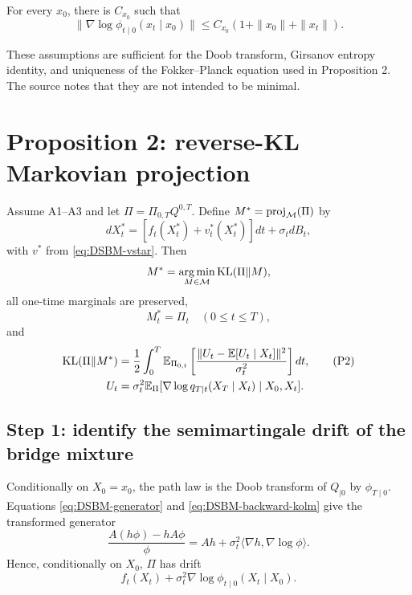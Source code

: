 \begin{assumption}
For every \(x_0\), there is \(C_{x_0}\) such that
\[
 \|\nabla\log\phi_{t\mid0}(x_t\mid x_0)\|
 \le C_{x_0}(1+\|x_0\|+\|x_t\|).
\]
\end{assumption}

These assumptions are sufficient for the Doob transform, Girsanov entropy identity, and uniqueness of the Fokker--Planck equation used in Proposition 2.  The source notes that they are not intended to be minimal.

\section{Proposition 2: reverse-KL Markovian projection}

\begin{proposition}[Proposition 2]
Assume A1--A3 and let \(\Pi=\Pi_{0,T}Q^{0,T}\).  Define \(M^*=\operatorname{proj}_{\mathcal{M}}(\Pi)\) by
\begin{equation}
 dX_t^*=[f_t(X_t^*)+v_t^*(X_t^*)]dt+\sigma_t dB_t,
 \tag{Definition 1}\label{eq:DSBM-Mstar}
\end{equation}
with \(v^*\) from \eqref{eq:DSBM-vstar}.  Then
\[
 M^*=\operatorname*{arg\,min}_{M\in\mathcal{M}}\mathrm{KL}(\Pi\|M),
\]
all one-time marginals are preserved,
\[
 M_t^*=\Pi_t\quad(0\le t\le T),
\]
and
\begin{align}
 \mathrm{KL}(\Pi\|M^*)
 &=\frac12\int_0^T\mathbb{E}_{\Pi_{0,t}}
 \left[
 \frac{\|U_t-\mathbb{E}[U_t\mid X_t]\|^2}{\sigma_t^2}
 \right]dt,
 \tag{P2}\label{eq:DSBM-P2-value}\\
 U_t
 &=\sigma_t^2\mathbb{E}_\Pi[\nabla\log q_{T\mid t}(X_T\mid X_t)\mid X_0,X_t].
\end{align}
\end{proposition}

\subsection{Step 1: identify the semimartingale drift of the bridge mixture}
Conditionally on \(X_0=x_0\), the path law is the Doob transform of \(Q_{\mid0}\) by \(\phi_{T\mid0}\).  Equations \eqref{eq:DSBM-generator} and \eqref{eq:DSBM-backward-kolm} give the transformed generator
\[
 \frac{A(h\phi)-hA\phi}{\phi}
 =Ah+\sigma_t^2\langle\nabla h,\nabla\log\phi\rangle.
\]
Hence, conditionally on \(X_0\), \(\Pi\) has drift
\begin{equation}
 f_t(X_t)+\sigma_t^2\nabla\log\phi_{t\mid0}(X_t\mid X_0).
 \tag{33}\label{eq:DSBM-conditional-drift}
\end{equation}

